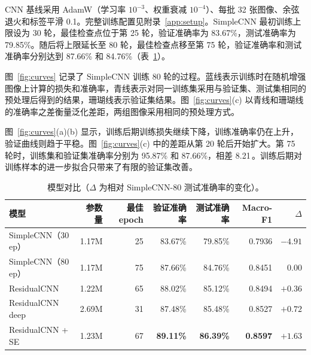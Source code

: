 \documentclass[11pt,a4paper,UTF8,fontset=windows]{ctexart}
\newcommand{\best}[1]{\textbf{#1}}
\newcommand{\pp}{\,\text{pp}}
\begin{document}
CNN 基线采用 AdamW（学习率 $10^{-3}$、权重衰减 $10^{-4}$）、每批 32 张图像、余弦退火和标签平滑 0.1。完整训练配置见附录~\ref{app:setup}。SimpleCNN 最初训练上限设为 30 轮，最佳检查点位于第 25 轮，验证准确率为 83.67\%，测试准确率为 79.85\%。随后将上限延长至 80 轮，最佳检查点移至第 75 轮，验证准确率和测试准确率分别达到 87.66\% 和 84.76\%（表~\ref{tab:scratch}）。

图~\ref{fig:curves} 记录了 SimpleCNN 训练 80 轮的过程。蓝线表示训练时在随机增强图像上计算的损失和准确率，青线表示对同一训练集采用与验证集、测试集相同的预处理后得到的结果，珊瑚线表示验证集结果。图~\ref{fig:curves}(c) 以青线和珊瑚线的准确率之差衡量泛化差距，两组图像采用相同的预处理方式。

图~\ref{fig:curves}(a)(b) 显示，训练后期训练损失继续下降，训练准确率仍在上升，验证曲线则趋于平稳。图~\ref{fig:curves}(c) 中的差距从第 20 轮后开始扩大。第 75 轮时，训练集和验证集准确率分别为 95.87\% 和 87.66\%，相差 8.21\pp。训练后期对训练样本的进一步拟合只带来了有限的验证集改善。
\begin{table}[H]
\centering
\small
\caption{模型对比（$\Delta$ 为相对 SimpleCNN-80 测试准确率的变化）。}
\label{tab:scratch}
\begin{tabular}{lrrrrrr}
\toprule
模型 & 参数量 & 最佳 epoch & 验证准确率 & 测试准确率 & Macro-F1 & $\Delta$ \\
\midrule
SimpleCNN（30 ep） & 1.17M & 25 & 83.67\% & 79.85\% & 0.7936 & $-4.91$ \\
SimpleCNN（80 ep） & 1.17M & 75 & 87.66\% & 84.76\% & 0.8451 & 0.00 \\
ResidualCNN        & 1.22M & 65 & 88.02\% & 85.12\% & 0.8494 & $+0.36$ \\
ResidualCNN deep   & 2.69M & 31 & 87.48\% & 85.48\% & 0.8527 & $+0.72$ \\
ResidualCNN + SE   & 1.23M & 67 & \best{89.11\%} & \best{86.39\%} & \best{0.8597} & $+1.63$ \\
\bottomrule
\end{tabular}

\end{table}
\end{document}
